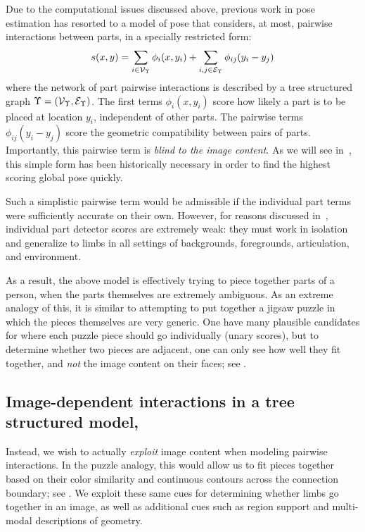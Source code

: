 Due to the computational issues discussed above, previous work in pose 
estimation has resorted to a model of pose that considers, at most, pairwise 
interactions between parts, in a specially restricted form:
$$ s(x,y) =  \sum_{i \in \mathcal{V}_{\Upsilon}} \phi_i(x,y_i) + \sum_{i,j \in 
\mathcal{E}_{\Upsilon}} \phi_{ij}(y_i - y_j) $$
where the network of part pairwise interactions is described by a tree 
structured graph $\Upsilon = (\mathcal{V}_\Upsilon,\mathcal{E}_\Upsilon)$.  The first terms 
$\phi_i(x,y_i)$ score how likely a part is to be placed at location $y_i$, 
independent of other parts.  The pairwise terms $\phi_{ij}(y_i-y_j)$ score the 
geometric compatibility between pairs of parts.  Importantly, this pairwise 
term is {\em blind to the image content}.  As we will see in~, this 
simple form has been historically necessary in order to find the highest 
scoring global pose quickly.

Such a simplistic pairwise term would be admissible if the individual part 
terms were sufficiently accurate on their own.  However, for reasons discussed 
in~, individual part detector scores are extremely weak: 
they must work in isolation and generalize to limbs in all settings of 
backgrounds, foregrounds, articulation, and environment.

As a result, the above model is effectively trying to piece together parts of a 
person, when the parts themselves are extremely ambiguous. As an extreme 
analogy of this, it is similar to attempting to put together a jigsaw puzzle in 
which the pieces themselves are very generic.  One have many plausible 
candidates for where each puzzle piece should go individually (unary scores), 
but to determine whether two pieces are adjacent, one can only see how well 
they fit together, and {\em not } the  image content on their faces; see 
.


\subsection{Image-dependent interactions in a tree structured 
model,~}
\label{sec:contrib1}
Instead, we wish to actually {\em exploit } image content when modeling 
pairwise interactions.  In the puzzle analogy, this would allow us to fit 
pieces together based on their color similarity and continuous contours across 
the connection boundary; see .  We exploit these 
same cues for determining whether limbs go together in an image, as well as 
additional cues such as region support and multi-modal descriptions of 
geometry.

